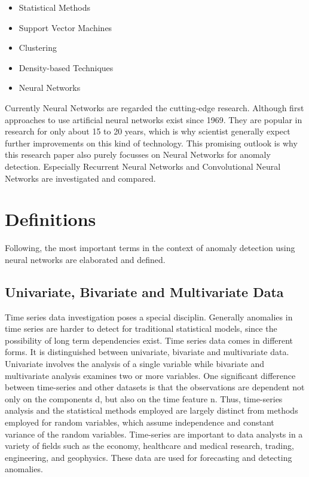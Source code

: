 \begin{itemize}
	\item Statistical Methods
	\item Support Vector Machines
	\item Clustering 
	\item Density-based Techniques
	\item Neural Networks 
\end{itemize}

Currently Neural Networks are regarded the cutting-edge research. Although first approaches to use artificial neural networks exist since 1969. They are popular in research for only about 15 to 20 years, which is why scientist generally expect further improvements on this kind of technology. This promising outlook is why this research paper also purely focusses on Neural Networks for anomaly detection. Especially Recurrent Neural Networks and Convolutional Neural Networks are investigated and compared.


\section{Definitions}
Following, the most important terms in the context of anomaly detection using neural networks are elaborated and defined. 

\subsection{Univariate, Bivariate and Multivariate Data}
Time series data investigation poses a special disciplin. Generally anomalies in time series are harder to detect for traditional statistical models, since the possibility of long term dependencies exist. Time series data comes in different forms. It is distinguished between univariate, bivariate and multivariate data. Univariate involves the analysis of a single variable while bivariate and multivariate analysis examines two or more variables. One significant difference between time-series and other datasets is that the observations are dependent not only on the components d, but also on the time feature n. Thus, time-series analysis and the statistical methods employed are largely distinct from methods employed for random variables, which assume independence and constant variance of the random variables. Time-series are important to data analysts in a variety of fields such as the economy, healthcare and medical research, trading, engineering, and geophysics. These data are used for forecasting and detecting anomalies.

